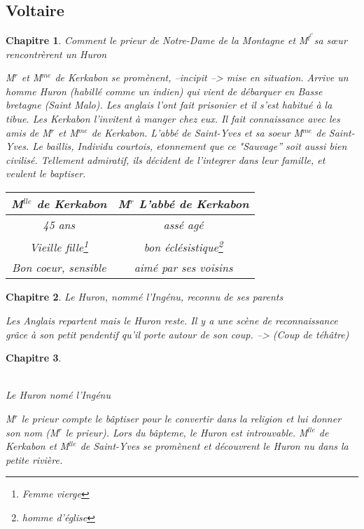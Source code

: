 \documentclass[12pt,a4paper]{article}
\newtheorem{chap}{Chapitre}
\begin{document}
	\subsection{Voltaire}
\begin{chap}\par
		{\selectfont \par
Comment le prieur de Notre-Dame  de la Montagne et M$^l^l^e$sa s\oe ur rencontrèrent un Huron\par
	M$^r$ et M$^{me}$ de Kerkabon se promènent, --incipit -->  mise en situation. 
	Arrive un homme Huron (habillé comme un indien) qui vient de débarquer en Basse bretagne (Saint Malo).
	Les anglais l'ont fait prisonier et il s'est habitué à la tibue.
	Les Kerkabon l'invitent à manger chez eux. 
	Il fait connaissance avec les amis de M$^r$ et M$^{me}$ de Kerkabon.
	L'abbé de Saint-Yves et sa soeur M$^{me}$ de Saint-Yves.
	Le baillis, Individu courtois, etonnement que ce "Sauvage'' soit aussi bien civilisé.
	Tellement admiratif, ils décident de l'integrer dans leur famille, et veulent le baptiser.

	\begin{table}[ht]
   		\centering
   		\begin{tabular}{|c|c|}
  			\hline
 	M$^{lle}$ de Kerkabon & M$^r$ L'abbé de Kerkabon \\
		   \hline 
	45 ans & assé agé\\
			\hline
	Vieille fille\footnote{Femme vierge} & bon éclésistique\footnote{homme d'église} \\
		   \hline
	Bon coeur, sensible & aimé par ses voisins\\
		   \hline
   		\end{tabular}
	\end{table}




}

\end{chap}
\begin{chap}
{\selectfont \par
Le Huron, nommé l'Ingénu, reconnu de ses parents\par
	Les Anglais repartent mais le Huron reste.
	Il y a une scène de reconnaissance grâce à son petit pendentif qu'il porte autour de son coup. --> (Coup de téhâtre)


}

\end{chap}
\begin{chap}
{\selectfont \\ \par \\
Le Huron nomé l'Ingénu\par
	M$^r$ le prieur compte le bâptiser pour le convertir dans la religion et lui donner son nom (M$^r$ le prieur).
	Lors du bâpteme, le Huron est introuvable.
	M$^{lle}$ de Kerkabon et M$^{lle}$ de Saint-Yves se promènent et découvrent le Huron nu dans la petite rivière.


}

\end{chap}
\end{document}
